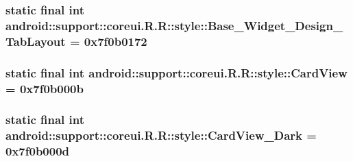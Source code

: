 \hypertarget{classandroid_1_1support_1_1coreui_1_1_r_1_1style_5be4ad23527ce259b4a087381d87aaeb}{
\subsubsection[{Base\_\-Widget\_\-Design\_\-TabLayout}]{\setlength{\rightskip}{0pt plus 5cm}static final int android::support::coreui.R.R::style::Base\_\-Widget\_\-Design\_\-TabLayout = 0x7f0b0172}}
\label{classandroid_1_1support_1_1coreui_1_1_r_1_1style_5be4ad23527ce259b4a087381d87aaeb}


\hypertarget{classandroid_1_1support_1_1coreui_1_1_r_1_1style_297ccda7454fdb161a65c9e0e2c133d1}{
\subsubsection[{CardView}]{\setlength{\rightskip}{0pt plus 5cm}static final int android::support::coreui.R.R::style::CardView = 0x7f0b000b}}
\label{classandroid_1_1support_1_1coreui_1_1_r_1_1style_297ccda7454fdb161a65c9e0e2c133d1}


\hypertarget{classandroid_1_1support_1_1coreui_1_1_r_1_1style_b70141d11a1412117f5230b45c75ce7a}{
\subsubsection[{CardView\_\-Dark}]{\setlength{\rightskip}{0pt plus 5cm}static final int android::support::coreui.R.R::style::CardView\_\-Dark = 0x7f0b000d}}
\label{classandroid_1_1support_1_1coreui_1_1_r_1_1style_b70141d11a1412117f5230b45c75ce7a}


